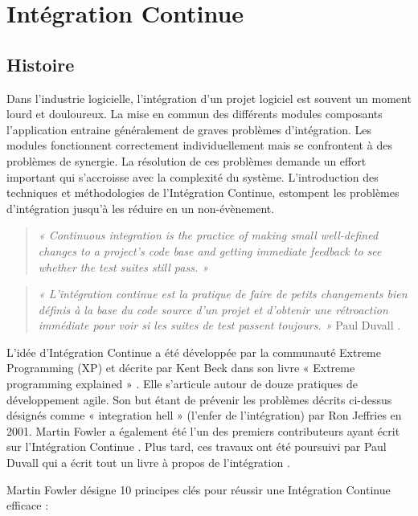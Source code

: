 \chapter{Intégration Continue} \label{ContinousIntegration}

  \section{Histoire}
  Dans l’industrie logicielle, l’intégration d’un projet logiciel est souvent un moment lourd et douloureux. La mise en commun des différents modules composants l’application entraine généralement de graves problèmes d’intégration. Les modules fonctionnent correctement individuellement mais se confrontent à des problèmes de synergie. La résolution de ces problèmes demande un effort important qui s’accroisse avec la complexité du système. L’introduction des techniques et méthodologies de l’Intégration Continue, estompent les problèmes d’intégration jusqu’à les réduire en un non-évènement.\\

  \begin{quotation}
    \emph{« Continuous integration is the practice of making small well-defined changes to a project’s code base and getting immediate feedback to see whether the test suites still pass. »}
  \end{quotation}

  \begin{quotation}
    \emph{« L'intégration continue est la pratique de faire de petits changements bien définis à la base du code source d'un projet et d'obtenir une rétroaction immédiate pour voir si les suites de test passent toujours. »} Paul Duvall \cite{Duv07}.\\
  \end{quotation}

  L’idée d'Intégration Continue a été développée par la communauté Extreme Programming (XP) et décrite par Kent Beck dans son livre « Extreme programming explained » \cite{Bec99}. Elle s'articule autour de douze pratiques de développement agile. Son but étant de prévenir les problèmes décrits ci-dessus désignés comme « integration hell » (l’enfer de l’intégration) par Ron Jeffries en 2001. Martin Fowler a également été l'un des premiers contributeurs ayant écrit sur l’Intégration Continue \cite{Fow00}. Plus tard, ces travaux ont été poursuivi par Paul Duvall qui a écrit tout un livre à propos de l’intégration \cite{Duv07}.

  Martin Fowler \cite{Fow00} désigne 10 principes clés pour réussir une Intégration Continue efficace :\\

